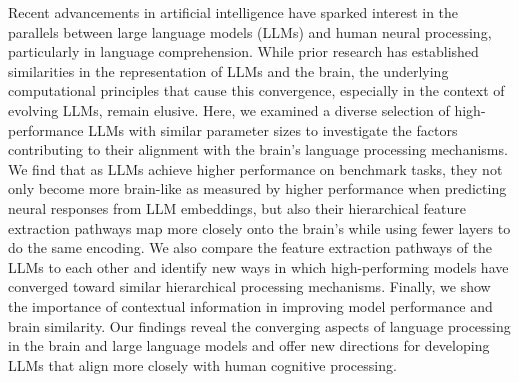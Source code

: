 Recent advancements in artificial intelligence have sparked interest in the parallels between large language models (LLMs) and human neural processing, particularly in language comprehension. While prior research has established similarities in the representation of LLMs and the brain, the underlying computational principles that cause this convergence, especially in the context of evolving LLMs, remain elusive. Here, we examined a diverse selection of high-performance LLMs with similar parameter sizes to investigate the factors contributing to their alignment with the brain's language processing mechanisms. We find that as LLMs achieve higher performance on benchmark tasks, they not only become more brain-like as measured by higher performance when predicting neural responses from LLM embeddings, but also their hierarchical feature extraction pathways map more closely onto the brain’s while using fewer layers to do the same encoding. We also compare the feature extraction pathways of the LLMs to each other and identify new ways in which high-performing models have converged toward similar hierarchical processing mechanisms. Finally, we show the importance of contextual information in improving model performance and brain similarity. Our findings reveal the converging aspects of language processing in the brain and large language models and offer new directions for developing LLMs that align more closely with human cognitive processing. 